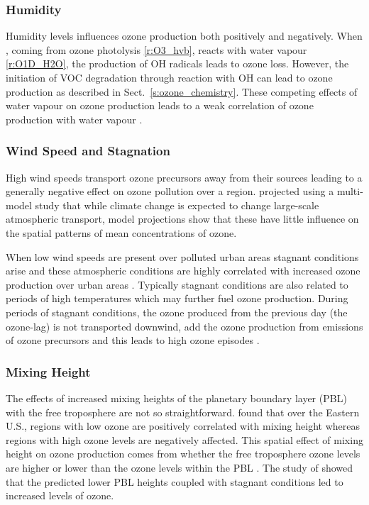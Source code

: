 \subsubsection{Humidity}
Humidity levels influences ozone production both positively and negatively.
When , coming from ozone photolysis \eqref{r:O3_hvb}, reacts with water vapour \eqref{r:O1D_H2O}, the production of OH radicals leads to ozone loss.
However, the initiation of VOC degradation through reaction with OH can lead to ozone production as described in Sect.~\ref{s:ozone_chemistry}.
These competing effects of water vapour on ozone production leads to a weak correlation of ozone production with water vapour \citep{Jacob:2009}.

\subsubsection{Wind Speed and Stagnation}
High wind speeds transport ozone precursors away from their sources leading to a generally negative effect on ozone pollution over a region.
\citet{Doherty:2013} projected using a multi-model study that while climate change is expected to change large-scale atmospheric transport, model projections show that these have little influence on the spatial patterns of mean concentrations of ozone.

When low wind speeds are present over polluted urban areas stagnant conditions arise and these atmospheric conditions are highly correlated with increased ozone production over urban areas \citep{Jacob:2009}.
Typically stagnant conditions are also related to periods of high temperatures which may further fuel ozone production.
During periods of stagnant conditions, the ozone produced from the previous day (the ozone-lag) is not transported downwind, add the ozone production from emissions of ozone precursors and this leads to high ozone episodes \citep{Jacob:2009}.

\subsubsection{Mixing Height}
The effects of increased mixing heights of the planetary boundary layer (PBL) with the free troposphere are not so straightforward.
\citet{Dawson:2007} found that over the Eastern U.S., regions with low ozone are positively correlated with mixing height whereas regions with high ozone levels are negatively affected.
This spatial effect of mixing height on ozone production comes from whether the free troposphere ozone levels are higher or lower than the ozone levels within the PBL \citep{Jacob:2009}.
The study of \citet{Dawson:2009} showed that the predicted lower PBL heights coupled with stagnant conditions led to increased levels of ozone.

